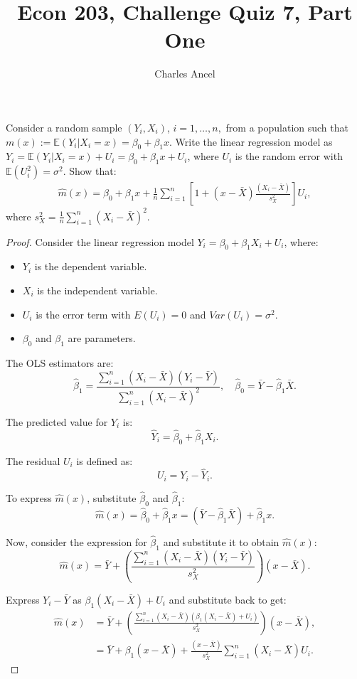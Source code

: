 \documentclass[12pt]{amsart}
\title{Econ 203, Challenge Quiz 7, Part One}
\author{Charles Ancel}
\theoremstyle{definition}
\numberwithin{equation}{section}
\begin{document}
\maketitle

Consider a random sample \((Y_i,X_i)\), \(i=1,\ldots,n,\) from a population such that \(m(x):=\mathbb{E}(Y_i|X_i=x)=\beta_0+\beta_1x\). Write the linear regression model as \(Y_i=\mathbb{E}(Y_i|X_i=x)+U_i=\beta_0+\beta_1x+U_i\), where \(U_i\) is the random error with \(\mathbb{E}(U_i^2)=\sigma^2\). Show that:
\begin{align*}
\widehat{m}(x)=\beta_0+\beta_1x+\frac{1}{n}\sum_{i=1}^n\left[1+(x-\bar{X})\frac{(X_i-\bar{X})}{s_X^2}\right]U_i,
\end{align*}
where \(s_X^2=\frac{1}{n}\sum_{i=1}^n(X_i-\bar{X})^2\).

\begin{proof}
    Consider the linear regression model \( Y_i = \beta_0 + \beta_1 X_i + U_i \), where:
    \begin{itemize}
        \item  \(Y_i\) is the dependent variable.
        \item  \(X_i\) is the independent variable.
        \item  \(U_i\) is the error term with \(E(U_i) = 0\) and \(Var(U_i) = \sigma^2\).
        \item  \(\beta_0\) and \(\beta_1\) are parameters.
    \end{itemize}
    
    The OLS estimators are:
    \[ \hat{\beta}_1 = \frac{\sum_{i=1}^n (X_i - \bar{X})(Y_i - \bar{Y})}{\sum_{i=1}^n (X_i - \bar{X})^2}, \quad \hat{\beta}_0 = \bar{Y} - \hat{\beta}_1 \bar{X}. \]

    The predicted value for \(Y_i\) is:
    \[ \hat{Y}_i = \hat{\beta}_0 + \hat{\beta}_1 X_i. \]

    The residual \(U_i\) is defined as:
    \[ U_i = Y_i - \hat{Y}_i. \]

    To express \( \widehat{m}(x) \), substitute \( \hat{\beta}_0 \) and \( \hat{\beta}_1 \):
    \[ \widehat{m}(x) = \hat{\beta}_0 + \hat{\beta}_1 x = (\bar{Y} - \hat{\beta}_1 \bar{X}) + \hat{\beta}_1 x. \]

    Now, consider the expression for \( \hat{\beta}_1 \) and substitute it to obtain \( \widehat{m}(x) \):
    \[ \widehat{m}(x) = \bar{Y} + \left( \frac{\sum_{i=1}^n (X_i - \bar{X})(Y_i - \bar{Y})}{s_X^2} \right) (x - \bar{X}). \]

    Express \( Y_i - \bar{Y} \) as \( \beta_1 (X_i - \bar{X}) + U_i \) and substitute back to get:
    \begin{align*}
    \widehat{m}(x) &= \bar{Y} + \left( \frac{\sum_{i=1}^n (X_i - \bar{X})(\beta_1 (X_i - \bar{X}) + U_i)}{s_X^2} \right) (x - \bar{X}), \\
    &= \bar{Y} + \beta_1 (x - \bar{X}) + \frac{(x - \bar{X})}{s_X^2} \sum_{i=1}^n (X_i - \bar{X})U_i.
    \end{align*}


\end{proof}
\end{document}
